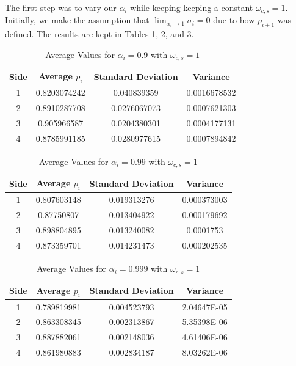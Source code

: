 \documentclass{article}
\begin{document}
The first step was to vary our $\alpha_i$ while keeping keeping a constant $\omega_{c,s} = 1$.  Initially, we make the assumption that $\lim_{\alpha_i\rightarrow 1}\sigma_i = 0$ due to how $p_{i+1}$ was defined. The results are kept in Tables 1, 2, and 3.  

\begin{table}[h!]
\centering
\caption{Average Values for $\alpha_i = 0.9$ with $\omega_{c,s} = 1$}
\label{tab:table1}
\begin{tabular}{|c|c|c|c|}
\hline
Side & Average $p_i$ & Standard Deviation & Variance\\
\hline
1 & 0.8203074242 & 0.040839359 & 0.0016678532\\
2 & 0.8910287708 & 0.0276067073 & 0.0007621303\\
3 & 0.905966587 & 0.0204380301 & 0.0004177131\\
4 & 0.8785991185 & 0.0280977615 & 0.0007894842\\
\hline
\end{tabular}
\end{table}

\begin{table}[h!]
\centering
\caption{Average Values for $\alpha_i = 0.99$ with $\omega_{c,s} = 1$}
\label{tab:table1}
\begin{tabular}{|c|c|c|c|}
\hline
Side & Average $p_i$ & Standard Deviation & Variance\\
\hline
1 & 0.807603148 & 0.019313276 & 0.000373003\\
2 & 0.87750807 & 0.013404922 & 0.000179692\\
3 & 0.898804895 & 0.013240082 & 0.0001753\\
4 & 0.873359701 & 0.014231473 & 0.000202535\\
\hline
\end{tabular}
\end{table}

\begin{table}[h!]
\centering
\caption{Average Values for $\alpha_i = 0.999$ with $\omega_{c,s} = 1$}
\label{tab:table1}
\begin{tabular}{|c|c|c|c|}
\hline
Side & Average $p_i$ & Standard Deviation & Variance\\
\hline
1 & 0.789819981 & 0.004523793 & 2.04647E-05\\
2 & 0.863308345 & 0.002313867 & 5.35398E-06\\
3 & 0.887882061 & 0.002148036 & 4.61406E-06\\
4 & 0.861980883 & 0.002834187 & 8.03262E-06\\
\hline
\end{tabular}
\end{table}
\end{document}
